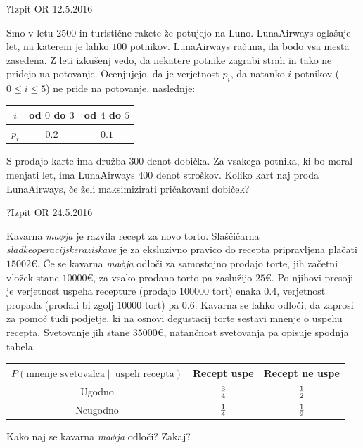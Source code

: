 \begin{naloga}{?}{Izpit OR 12.5.2016}
\begin{vprasanje}[lunaairways]
Smo v letu 2500 in turistične rakete že potujejo na Luno.
LunaAirways oglašuje let, na katerem je lahko $100$ potnikov.
LunaAirways računa, da bodo vsa mesta zasedena.
Z leti izkušenj vedo,
da nekatere potnike zagrabi strah in tako ne pridejo na potovanje.
Ocenjujejo, da je verjetnost $p_i$,
da natanko $i$ potnikov ($0 \le i \le 5$) ne pride na potovanje,
naslednje:
\begin{center}
\begin{tabular}{c|cc}
$i$ & od $0$ do $3$ & od $4$ do $5$ \\ \hline
$p_i$ & $0.2$ & $0.1$
\end{tabular}
\end{center}

S prodajo karte ima družba $300$ denot dobička.
Za vsakega potnika, ki bo moral menjati let,
ima LunaAirways $400$ denot stroškov.
Koliko kart naj proda LunaAirways, če želi maksimizirati pričakovani dobiček?
\end{vprasanje}
\begin{odgovor}
\end{odgovor}
\end{naloga}


\begin{naloga}{?}{Izpit OR 24.5.2016}
\begin{vprasanje}[maphija]
Kavarna {\em ma$\phi$ja} je razvila recept za novo torto.
Slaščičarna {\em sladkeoperacijskeraziskave}
je za eksluzivno pravico do recepta pripravljena plačati $15002 €$.
Če se kavarna {\em ma$\phi$ja} odloči za samostojno prodajo torte,
jih začetni vložek stane $10000 €$,
za vsako prodano torto pa zaslužijo $25 €$.
Po njihovi presoji
je verjetnost uspeha recepture (prodajo $100000$ tort) enaka $0.4$,
verjetnost propada (prodali bi zgolj $10000$ tort) pa $0.6$.
Kavarna se lahko odloči, da zaprosi za pomoč tudi pod\-jet\-je,
ki na osnovi degustacij torte sestavi mnenje o uspehu recepta.
Svetovanje jih stane $35000 €$,
natančnost svetovanja pa opisuje spodnja tabela.
\begin{center}
\begin{tabular}{c|cc}
$P(\text{mnenje svetovalca} \;|\;\ \text{uspeh recepta})$
& Recept uspe & Recept ne uspe \\ \hline
Ugodno   & ${3 \over 4}$ & ${1 \over 2}$ \\
Neugodno & ${1 \over 4}$ & ${1 \over 2}$
\end{tabular}
\end{center}
Kako naj se kavarna {\em ma$\phi$ja} odloči?
Zakaj?
\end{vprasanje}
\begin{odgovor}
\end{odgovor}
\end{naloga}



